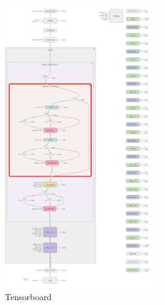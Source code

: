 \documentclass{article}
\begin{document}
\begin{figure}[p]
	\centering
	\includegraphics[width=0.6\textwidth]{figures/cifar_4_Extended}
	\caption{Tensorboard}
	\label{fig:tensorboard}
\end{figure}




\end{document}
